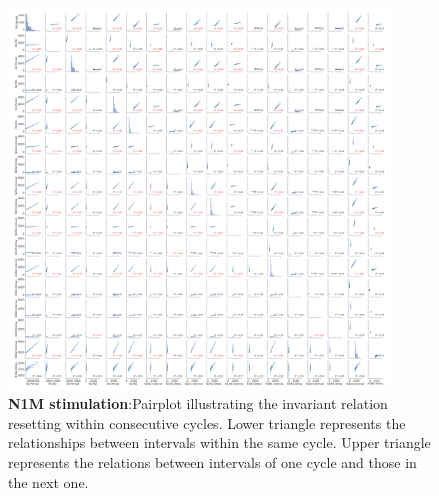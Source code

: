\begin{figure}[htbp]
	\centering
	\includegraphics[width=0.9\textwidth]{./invariants/data/MODEL/n1m_driven/images/3phases/_output_pairplot_reset.png}
	\caption{\textbf{N1M stimulation}:Pairplot illustrating the invariant relation resetting within consecutive cycles. Lower triangle represents the relationships between intervals within the same cycle. Upper triangle represents the relations between intervals of one cycle and those in the next one. }
	\label{fig:N1M stimulation pairplot reset}
\end{figure}

